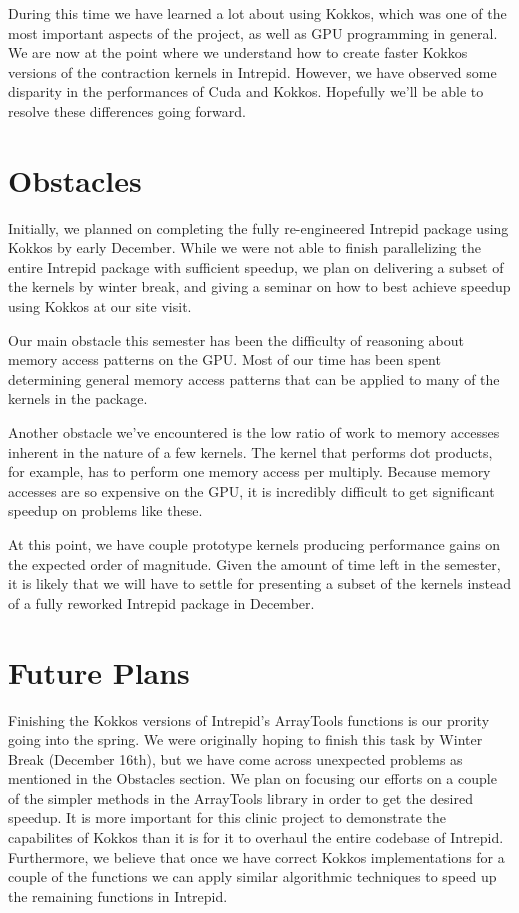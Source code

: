 \documentclass[midyear]{hmcclinic}
\begin{document}
During this time we have learned a lot about using Kokkos, which was one of the
most important aspects of the project, as well as GPU programming in general. We
are now at the point where we understand how to create faster Kokkos versions of
the contraction kernels in Intrepid. However, we have observed some disparity in
the performances of Cuda and Kokkos. Hopefully we'll be able to resolve these
differences going forward.

\section*{Obstacles}
Initially, we planned on completing the  fully re-engineered Intrepid package
using Kokkos by early December. While we were not able to finish parallelizing
the entire Intrepid package with sufficient speedup, we plan on delivering a
subset of the kernels by winter break, and giving a seminar on how to best
achieve speedup using Kokkos at our site visit.

Our main obstacle this semester has been the difficulty of reasoning about
memory access patterns on the GPU. Most of our time has been spent determining
general memory access patterns that can be applied to many of the kernels in the
package.

Another obstacle we've encountered is the low ratio of work to memory accesses
inherent in the nature of a few kernels. The kernel that performs dot products,
for example, has to perform one memory access per multiply. Because memory
accesses are so expensive on the GPU, it is incredibly difficult to get
significant speedup on problems like these.

At this point, we have couple prototype kernels producing performance gains on
the expected order of magnitude.  Given the amount of time left in the semester,
it is likely that we will have to settle for presenting a subset of the kernels
instead of a fully reworked Intrepid package in December. 

\section*{Future Plans}
Finishing the Kokkos versions of Intrepid's ArrayTools functions is our prority
going into the spring.  We were originally hoping to finish this task by Winter
Break (December 16th), but we have come across unexpected problems as mentioned
in the Obstacles section. We plan on focusing our efforts on a couple of the
simpler methods in the ArrayTools library in order to get the desired speedup.
It is more important for this clinic project to demonstrate the capabilites of
Kokkos than it is for it to overhaul the entire codebase of Intrepid.
Furthermore, we believe that once we have correct Kokkos implementations for a
couple of the functions we can apply similar algorithmic techniques to speed up
the remaining functions in Intrepid. 
\end{document}
